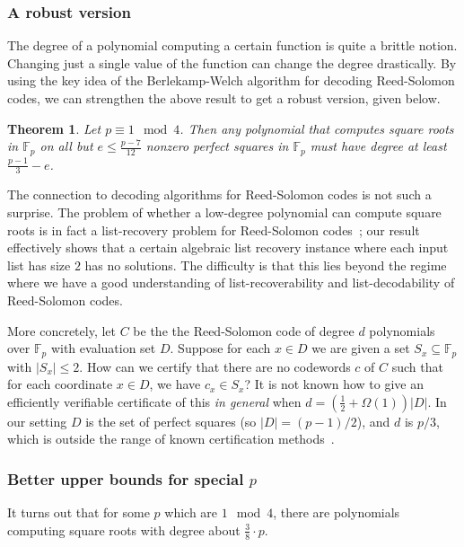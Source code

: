 \documentclass{article}
\newtheorem{theorem}{Theorem}[section]
\newcommand{\F}{\mathbb{F}}
\begin{document}
\subsubsection*{A robust version}


The degree of a polynomial computing a certain function is quite a brittle notion. Changing just a single value of the function can change the degree drastically. By using the key idea of the Berlekamp-Welch algorithm for decoding Reed-Solomon codes, we can strengthen the above result to get a robust version, given below.

\begin{theorem}
\label{thm:1mod4robust}
 Let $p \equiv 1 \mod 4$. Then any polynomial that computes square roots in $\F_p$ on all but $e \leq \frac{p-7}{12}$ nonzero perfect squares in $\F_p$ must have degree at least $\frac{p-1}{3} - e$.
\end{theorem}

The connection to decoding algorithms for Reed-Solomon codes is not such a surprise. The problem of whether a low-degree polynomial can compute square roots is in fact a list-recovery problem for Reed-Solomon codes~\cite{RSlist}; our result effectively shows that a certain algebraic list recovery instance where each input list has size $2$ has no solutions. The difficulty is that this lies beyond the regime where we have a good understanding of list-recoverability and list-decodability of Reed-Solomon codes.

More concretely, let $C$ be the the Reed-Solomon code of degree $d$ polynomials over $\F_p$ with evaluation set $D$.
Suppose for each $x \in D$ we are given a set $S_x \subseteq \F_p$ with $|S_x| \leq 2$. How can we certify that there are no codewords $c$ of $C$ such that for each coordinate $x \in D$, we have $c_x \in S_x$? 
It is not known how to give an efficiently verifiable certificate of this {\em in general} when $d = \left(\frac{1}{2} + \Omega(1) \right) |D|$. In our setting $D$ is the set of perfect squares (so $|D| = (p-1)/2$), and $d$ is $p/3$, which is outside the range of known certification methods~\cite{RSlist}.



\subsubsection*{Better upper bounds for special $p$}

It turns out that for some $p$ which are $1 \mod 4$, there are polynomials computing square roots with degree about $\frac{3}{8} \cdot p$. 
\end{document}
